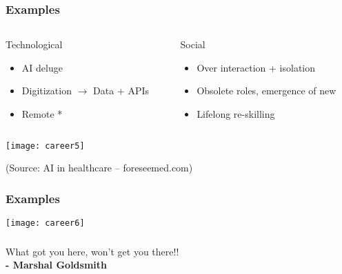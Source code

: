 \begin{frame}[fragile]\frametitle{Examples}
\begin{columns}
    \begin{column}[T]{0.5\linewidth}
			Technological
      \begin{itemize}
			\item AI deluge
			\item Digitization $\rightarrow$ Data + APIs
			\item Remote *
			\end{itemize}
    \end{column}
    \begin{column}[T]{0.5\linewidth}
			Social
      \begin{itemize}
			\item Over interaction + isolation
			\item Obsolete roles, emergence of new
			\item Lifelong re-skilling
			\end{itemize}		
    \end{column}
  \end{columns}
	
	\begin{center}
\texttt{[image: career5]}
\end{center}

{\tiny (Source: AI in healthcare – foreseemed.com)}

\end{frame}

\begin{frame}[fragile]\frametitle{Examples}
	
	\begin{center}
	\texttt{[image: career6]}
	\end{center}

\end{frame}


\begin{frame}[fragile]\frametitle{}
	
	\begin{center}
	{\Large What got you here,  won’t get you there!!} \\
	{\bf - Marshal Goldsmith}
	\end{center}

\end{frame}


